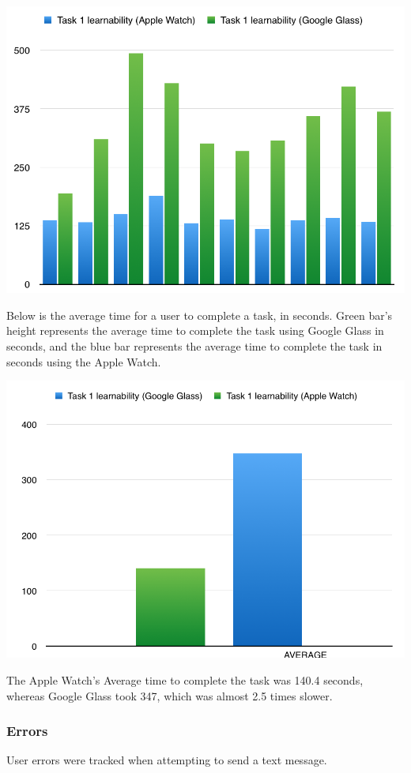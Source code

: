 \documentclass[paper=a4, fontsize=11pt]{scrartcl}	%
\numberwithin{equation}{section}															%
\numberwithin{figure}{section}																%
\numberwithin{table}{section}																%
\begin{document}
\includegraphics[scale=0.7]{charttask1}

Below is the average time for a user to complete a task, in seconds. Green bar's height represents the average time to complete the task using Google Glass in seconds, and the blue bar represents the average time to complete the task in seconds using the Apple Watch.

\includegraphics[scale=0.6]{task1average}

The Apple Watch's Average time to complete the task was 140.4 seconds, whereas Google Glass took 347, which was almost 2.5 times slower.


\subsubsection{Errors}
User errors were tracked when attempting to send a text message.
\end{document}
